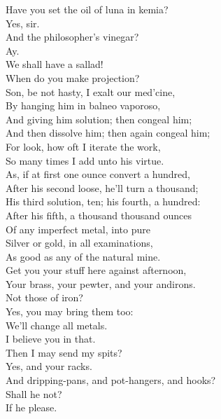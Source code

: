 \documentclass{memoir}
\begin{document}
\begin{drama*}
 Have you set the oil of luna in kemia?\\
\facespeaks  Yes, sir.\\
\subtlespeaks {} And the philosopher's vinegar?\\
\facespeaks  Ay.\\
\surlyspeaks {} We shall have a sallad!\\
\mammonspeaks {} When do you make projection?\\
\subtlespeaks  Son, be not hasty, I exalt our med'cine,\\
 By hanging him in balneo vaporoso,\\
 And giving him solution; then congeal him;\\
 And then dissolve him; then again congeal him;\\
 For look, how oft I iterate the work,\\
 So many times I add unto his virtue.\\
 As, if at first one ounce convert a hundred,\\
 After his second loose, he'll turn a thousand;\\
 His third solution, ten; his fourth, a hundred:\\
 After his fifth, a thousand thousand ounces\\
 Of any imperfect metal, into pure\\
 Silver or gold, in all examinations,\\
 As good as any of the natural mine.\\
 Get you your stuff here against afternoon,\\
 Your brass, your pewter, and your andirons.\\
\mammonspeaks  Not those of iron?\\
\subtlespeaks {} Yes, you may bring them too:\\
 We'll change all metals.\\
\surlyspeaks {} I believe you in that.\\
\mammonspeaks  Then I may send my spits?\\
\subtlespeaks {} Yes, and your racks.\\
\surlyspeaks  And dripping-pans, and pot-hangers, and hooks?\\
 Shall he not?\\
\subtlespeaks {} If he please.\\

\end{drama*}
\end{document}
